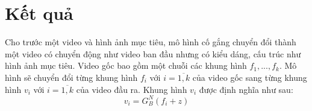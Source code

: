 \documentclass[12pt]{report}%
\begin{document}
\section{Kết quả} %
Cho trước một video và hình ảnh mục tiêu, mô hình cố gắng chuyển đổi thành một video có chuyển động như video ban đầu nhưng có kiểu dáng, cấu trúc như hình ảnh mục tiêu. Video gốc bao gồm một chuỗi các khung hình $f_1,...,f_k$. Mô hình sẽ chuyển đổi từng khung hình $f_i$ với $i = \overline {1,k} $  của video gốc sang từng khung hình $v_i$ với  $i = \overline {1,k} $ của video đầu ra. Khung hình $v_i$ được định nghĩa như sau:
\begin{equation}
    {v_i} = G_B^N\left( {{f_i} + z} \right)
\end{equation}
\end{document}
